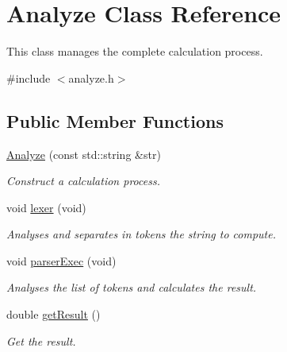 \hypertarget{class_analyze}{}\section{Analyze Class Reference}
\label{class_analyze}


This class manages the complete calculation process.  




{\ttfamily \#include $<$analyze.\+h$>$}

\subsection*{Public Member Functions}
\begin{DoxyCompactItemize}
\item 
\hyperlink{class_analyze_a373e5e79d15401c429b980f819ce76b3}{Analyze} (const std\+::string \&str)
\begin{DoxyCompactList}\small\item\em Construct a calculation process. \end{DoxyCompactList}\item 
\hypertarget{class_analyze_a1090a6b9655c4770707d65ee8ebc124a}{}void \hyperlink{class_analyze_a1090a6b9655c4770707d65ee8ebc124a}{lexer} (void)\label{class_analyze_a1090a6b9655c4770707d65ee8ebc124a}

\begin{DoxyCompactList}\small\item\em Analyses and separates in tokens the string to compute. \end{DoxyCompactList}\item 
\hypertarget{class_analyze_ae0c00996ea3ce2e87f6cdda0c8df7065}{}void \hyperlink{class_analyze_ae0c00996ea3ce2e87f6cdda0c8df7065}{parser\+Exec} (void)\label{class_analyze_ae0c00996ea3ce2e87f6cdda0c8df7065}

\begin{DoxyCompactList}\small\item\em Analyses the list of tokens and calculates the result. \end{DoxyCompactList}\item 
\hypertarget{class_analyze_a58fa5815d0944fe2540fac57c695d4af}{}double \hyperlink{class_analyze_a58fa5815d0944fe2540fac57c695d4af}{get\+Result} ()\label{class_analyze_a58fa5815d0944fe2540fac57c695d4af}

\begin{DoxyCompactList}\small\item\em Get the result. \end{DoxyCompactList}\end{DoxyCompactItemize}
